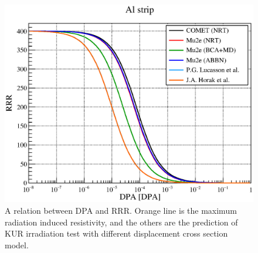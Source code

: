 \begin{figure}[H]
 \centering
 \includegraphics[scale=0.5]{chapter4/fig/dpadegradation.eps}
 \caption{A relation between DPA and RRR. Orange line is the maximum radiation induced resistivity, and the others are the prediction of KUR irradiation test with different displacement cross section model.}
 \label{dpaaa}
\end{figure}


